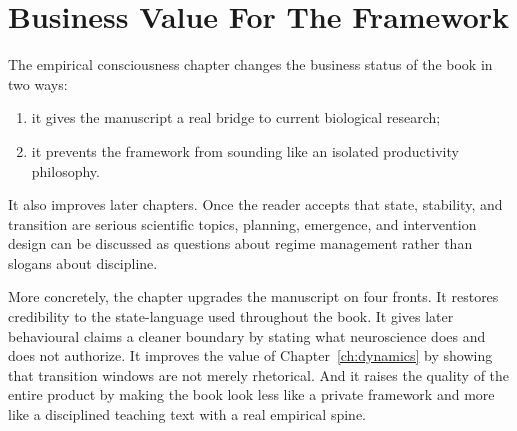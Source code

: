\section{Business Value For The Framework}

The empirical consciousness chapter changes the business status of the book in
two ways:
\begin{enumerate}[nosep]
  \item it gives the manuscript a real bridge to current biological research;
  \item it prevents the framework from sounding like an isolated productivity
        philosophy.
\end{enumerate}

It also improves later chapters. Once the reader accepts that state,
stability, and transition are serious scientific topics, planning, emergence,
and intervention design can be discussed as questions about regime management
rather than slogans about discipline.

\begin{discussion}
More concretely, the chapter upgrades the manuscript on four fronts. It
restores credibility to the state-language used throughout the book. It gives
later behavioural claims a cleaner boundary by stating what neuroscience does
and does not authorize. It improves the value of Chapter~\ref{ch:dynamics} by
showing that transition windows are not merely rhetorical. And it raises the
quality of the entire product by making the book look less like a private
framework and more like a disciplined teaching text with a real empirical
spine.
\end{discussion}
